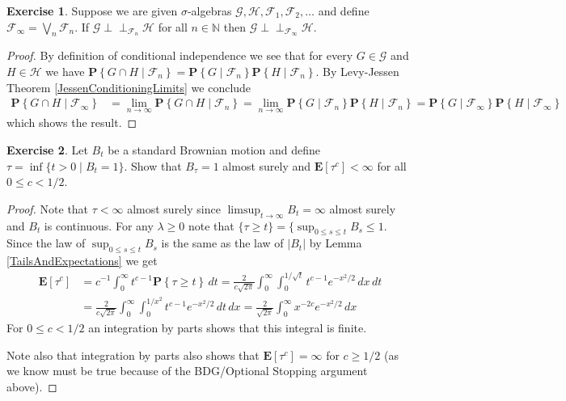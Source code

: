 \documentclass{amsbook}
\theoremstyle{definition}
\newtheorem{xca}{Exercise}
\theoremstyle{remark}
\newcommand{\Independent}{\perp \! \! \! \perp}
\newcommand{\cindependent}[3]{#1 \Independent_{#3} #2}
\newcommand{\expectation}[1]{\textbf{E}\left[#1\right]}
\newcommand{\probability}[1]{\textbf{P}\left \{#1 \right \}}
\newcommand{\cprobability}[2]{\textbf{P} \left \{#2 \mid #1 \right \}}
\newcommand{\naturals}{\mathbb{N}}
\newcommand{\abs}[1]{\left \vert #1 \right \vert}
\begin{document}
\begin{xca}Suppose we are given $\sigma$-algebras $\mathcal{G},
  \mathcal{H}, \mathcal{F}_1, \mathcal{F}_2, \dotsc$ and define
  $\mathcal{F}_\infty = \bigvee_n \mathcal{F}_n$.  If
  $\cindependent{\mathcal{G}}{\mathcal{H}}{\mathcal{F}_n}$ for all $n
  \in \naturals$ then $\cindependent{\mathcal{G}}{\mathcal{H}}{\mathcal{F}_\infty}$.
\end{xca}
\begin{proof}
By definition of conditional independence we see that for every $G \in
\mathcal{G}$ and $H \in \mathcal{H}$ we have
$\cprobability{\mathcal{F}_n}{G \cap H} =
\cprobability{\mathcal{F}_n}{G} \cprobability{\mathcal{F}_n}{H}$.  By
Levy-Jessen Theorem \ref{JessenConditioningLimits} we conclude
\begin{align*}
\cprobability{\mathcal{F}_\infty}{G \cap H} &=  \lim_{n \to \infty} \cprobability{\mathcal{F}_n}{G \cap H} =
 \lim_{n \to \infty}\cprobability{\mathcal{F}_n}{G}
 \cprobability{\mathcal{F}_n}{H} = \cprobability{\mathcal{F}_\infty}{G}
 \cprobability{\mathcal{F}_\infty}{H}
\end{align*}
which shows the result.
\end{proof}

\begin{xca}Let $B_t$ be a standard Brownian motion and define $\tau =
  \inf \lbrace t > 0 \mid B_t = 1 \rbrace$.  Show that
  $B_\tau = 1$ almost surely and $\expectation{\tau^c} < \infty$ for
  all $0 \leq c < 1/2$.
\end{xca}
\begin{proof}
Note that $\tau < \infty$ almost surely since $\limsup_{t \to \infty}
B_t = \infty$ almost surely and $B_t$ is continuous.  For any $\lambda
\geq 0$ note that $ \lbrace \tau \geq t \rbrace = \lbrace
\sup_{0 \leq s \leq t} B_s \leq 1$.  Since the law of $\sup_{0 \leq s
  \leq t} B_s$ is the same as the law of $\abs{B_t}$ by Lemma
\ref{TailsAndExpectations} we get
\begin{align*}
\expectation{\tau^c} &= c^{-1} \int_0^\infty t^{c-1} \probability{\tau
  \geq t} \, dt = \frac{2}{c \sqrt{2\pi}} \int_0^\infty
\int_0^{1/\sqrt{t}}  t^{c-1} e^{-x^2/2} \, dx \, dt \\
&= \frac{2}{c \sqrt{2\pi}} \int_0^\infty
\int_0^{1/x^2}  t^{c-1} e^{-x^2/2} \, dt \, dx = \frac{2}{\sqrt{2\pi}}
\int_0^\infty x^{-2c} e^{-x^2/2} \, dx 
\end{align*}
For $0 \leq c < 1/2$ an integration by parts shows that this integral
is finite.

Note also that integration by parts also shows that
$\expectation{\tau^c} = \infty$ for $c \geq 1/2$ (as we know must be
true because of the BDG/Optional Stopping argument above).
\end{proof}
\end{document}
